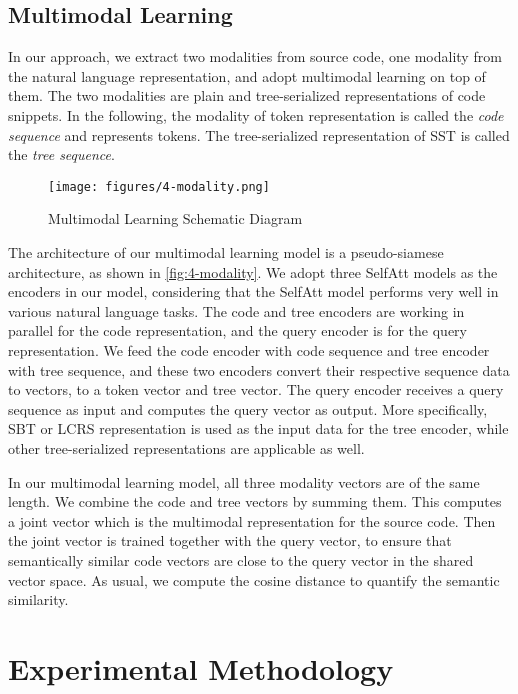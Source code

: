 \documentclass[conference]{IEEEtran}
\begin{document}
\subsection{Multimodal Learning}

In our approach, we extract two modalities from source code, one modality from the natural language representation, and adopt multimodal learning on top of them. The two modalities are plain and tree-serialized representations of code snippets. In the following, the modality of token representation is called the \emph{code sequence} and represents tokens. The tree-serialized representation of SST is called the \emph{tree sequence}.

\begin{figure}[!htb]
  \centering
  \texttt{[image: figures/4-modality.png]}
  \caption{Multimodal Learning Schematic Diagram}
  \label{fig:4-modality}
\end{figure}

The architecture of our multimodal learning model is a pseudo-siamese architecture, as shown in \autoref{fig:4-modality}. We adopt three SelfAtt models as the encoders in our model, considering that the SelfAtt model performs very well in various natural language tasks. The code and tree encoders are working in parallel for the code representation, and the query encoder is for the query representation. We feed the code encoder with code sequence and tree encoder with tree sequence, and these two encoders convert their respective sequence data to vectors, to a token vector and tree vector. The query encoder receives a query sequence as input and computes the query vector as output. More specifically, SBT or LCRS representation is used as the input data for the tree encoder, while other tree-serialized representations are applicable as well.

In our multimodal learning model, all three modality vectors are of the same length. We combine the code and tree vectors by summing them. This computes a joint vector which is the multimodal representation for the source code. Then the joint vector is trained together with the query vector, to ensure that semantically similar code vectors are close to the query vector in the shared vector space. As usual, we compute the cosine distance to quantify the semantic similarity.
 \section{Experimental Methodology}
\label{sec:methodology}
\end{document}
